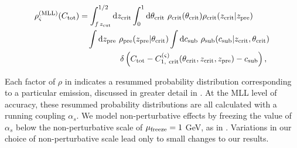 \begin{equation}
\begin{aligned}
    \rho^{\rm (MLL)}_\varsigma(C_{\rm tot})
    &=
    \int_{f\,z_{\rm cut}}^{1/2} \dd z_{\rm crit}
    \int_0^1 \dd \theta_{\rm crit}
    ~
    \rho_{\rm crit}(\theta_{\rm crit})
    \rho_{\rm crit}(z_{\rm crit} | z_{\rm pre})
    \\
    &~~~
    \int \dd z_{\rm pre}
    ~
    \rho_{\rm pre}(z_{\rm pre}|\theta_{\rm crit})
    \int \dd c_{\rm sub}
    ~
    \rho_{\rm sub}(c_{\rm sub}|z_{\rm crit},\theta_{\rm crit})
    \\
    &~~~~~~~~~~~~~~~
    \delta\left(
        C_{\rm tot}
        -
        C^{(\varsigma)}_{1,~\rm crit}
        (\theta_{\rm crit}, z_{\rm crit}, z_{\rm pre})
        -
        c_{\rm sub}
    \right)
    \label{eqn:convolution},
\end{aligned}
\end{equation}

Each factor of \(\rho\) in  indicates a resummed probability distribution corresponding to a particular emission, discussed in greater detail in .
%
At the MLL level of accuracy, these resummed probability distributions are all calculated with a running coupling \(\alpha_s\).
%
We model non-perturbative effects by freezing the value of \(\alpha_s\) below the non-perturbative scale of \(\mu_{\rm freeze} = 1\) GeV, as in .
%
Variations in our choice of non-perturbative scale lead only to small changes to our results.


